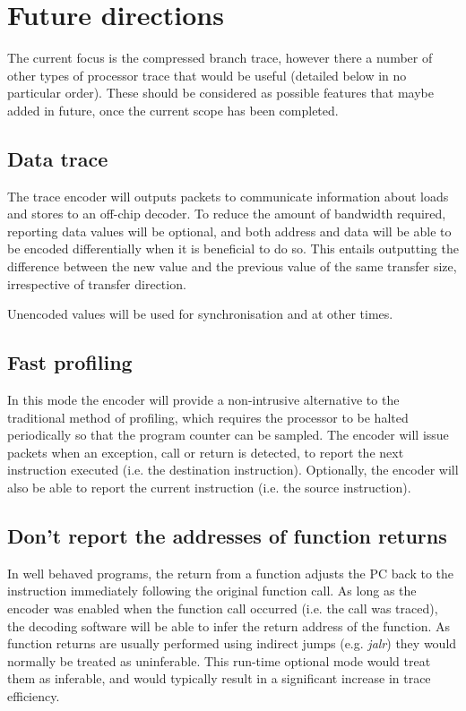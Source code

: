 \chapter{Future directions} \label{Future}

The current focus is the compressed branch trace, however there a
number of other types of processor trace that would be useful 
(detailed below in no particular order). These
should be considered as possible features that maybe added in future,
once the current scope has been completed.

\section{Data trace}

The trace encoder will outputs packets to communicate information
about loads and stores to an off-chip decoder.  To reduce the amount
of bandwidth required, reporting data values will be optional, and
both address and data will be able to be encoded differentially when
it is beneficial to do so.  This entails outputting the difference
between the new value and the previous value of the same transfer
size, irrespective of transfer direction.

Unencoded values will be used for synchronisation and at other times.

\section{Fast profiling}

In this mode the encoder will provide a non-intrusive alternative to
the traditional method of profiling, which requires the processor to
be halted periodically so that the program counter can be sampled.
The encoder will issue packets when an exception, call or return is
detected, to report the next instruction executed (i.e. the
destination instruction).  Optionally, the encoder will also be able to
report the current instruction (i.e. the source instruction).

\section{Don't report the addresses of function returns}

In well behaved programs, the return from a function adjusts the PC back to the 
instruction immediately following the original function call.  As long as the 
encoder was enabled when the function call occurred (i.e. the call was traced),
the decoding software will be able to infer the return address of the function.
As function returns are usually performed using indirect jumps (e.g. \textit{jalr})
they would normally be treated as uninferable.  This run-time optional mode would
treat them as inferable, and would typically result in a significant increase in
trace efficiency.


